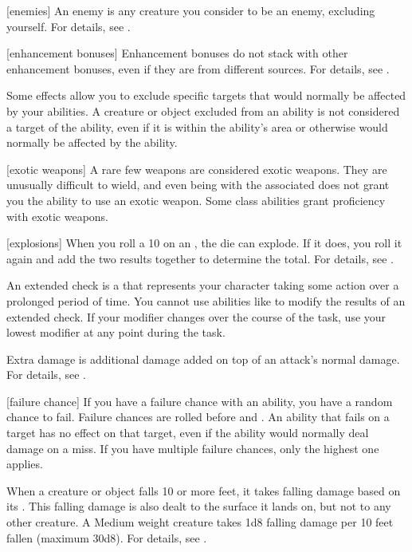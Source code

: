 [enemies] An enemy is any creature you consider to be an enemy, excluding yourself.
For details, see .

[enhancement bonuses] Enhancement bonuses do not stack with other enhancement bonuses, even if they are from different sources.
For details, see .

 Some effects allow you to exclude specific targets that would normally be affected by your abilities.
A creature or object excluded from an ability is not considered a target of the ability, even if it is within the ability's area or otherwise would normally be affected by the ability.

[exotic weapons] A rare few weapons are considered exotic weapons.
They are unusually difficult to wield, and even being  with the associated  does not grant you the ability to use an exotic weapon.
Some class abilities grant proficiency with exotic weapons.

[explosions] When you roll a 10 on an , the die can explode.
If it does, you roll it again and add the two results together to determine the total.
For details, see .

 An extended check is a  that represents your character taking some action over a prolonged period of time.
You cannot use abilities like  to modify the results of an extended check.
If your modifier changes over the course of the task, use your lowest modifier at any point during the task.

 Extra damage is additional damage added on top of an attack's normal damage.
For details, see .

[failure chance] If you have a failure chance with an ability, you have a random chance to fail.
Failure chances are rolled before  and .
An ability that fails on a target has no effect on that target, even if the ability would normally deal damage on a miss.
If you have multiple failure chances, only the highest one applies.

 When a creature or object falls 10 or more feet, it takes falling damage based on its .
This falling damage is also dealt to the surface it lands on, but not to any other creature.
A Medium weight creature takes 1d8 falling damage per 10 feet fallen (maximum 30d8).
For details, see .

